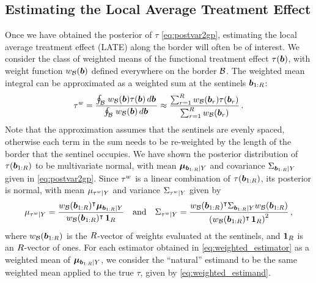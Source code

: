 \subsection{Estimating the Local Average Treatment Effect}
\label{sec:ate}

Once we have obtained the posterior of \(\tau\) \eqref{eq:postvar2gp}, estimating the local average treatment effect (LATE) along the border will often be of interest.
We consider the class of weighted means of the functional treatment effect \(\tau\del{\sentinel}\),
with weight function \(w_{\mathcal{B}}(\bm{b})\) defined everywhere on the border \(\mathcal{B}\).
The weighted mean integral can be approximated as a weighted sum at the sentinels \(\bm{b}_{1:R}\):
\begin{equation}
    \tau^{w} = \frac{\oint_{\mathcal{B}} \left. w_{\mathcal{B}}(\bm{b}) \tau(\bm{b}) \mathop{d \bm{b}} \right.}
    {\oint_{\mathcal{B}} \left. w_{\mathcal{B}}(\bm{b}) \mathop{d \bm{b}} \right.}
    \approx \frac{\sum_{r=1}^R w_{\mathcal{B}}(\bm{b}_r) \tau(\bm{b}_r)}
    {\sum_{r=1}^R w_{\mathcal{B}}(\bm{b}_r) } \,.
\label{eq:weighted_estimand}
\end{equation}
Note that the approximation assumes that the sentinels are evenly spaced, otherwise each term in the sum needs to be re-weighted by the length of the border that the sentinel occupies.
We have shown the posterior distribution of \(\tau(\bm{b}_{1:R})\) to be multivariate normal, with mean \(\bm{\mu}_{\bm{b}_{1:R} \mid Y}\) and covariance \(\Sigma_{\bm{b}_{1:R} \mid Y}\) given in \autoref{eq:postvar2gp}.
Since \(\tau^{w}\) is a linear combination of \(\tau(\bm{b}_{1:R})\), its posterior is normal, with mean \(\mu_{\tau^{w} \mid Y}\) and variance \(\Sigma_{\tau^{w} \mid Y}\) given by
\begin{equation}
    \mu_{\tau^{w} \mid Y} = \frac{w_{\mathcal{B}}(\bm{b}_{1:R})^{\intercal} \bm{\mu}_{\bm{b}_{1:R} \mid Y}}
    {w_{\mathcal{B}}(\bm{b}_{1:R})^{\intercal}  \operatorname{\mathbf{1}}_R}\quad\text{and}\quad
    \Sigma_{\tau^{w} \mid Y} = \frac{w_{\mathcal{B}}(\bm{b}_{1:R})^{\intercal} \Sigma_{\bm{b}_{1:R} \mid Y} w_{\mathcal{B}}(\bm{b}_{1:R})}
    { \left\lparen w_{\mathcal{B}}(\bm{b}_{1:R})^{\intercal}  \operatorname{\mathbf{1}}_R \right\rparen^2 } \,,
\label{eq:weighted_estimator}
\end{equation}
where \(w_{\mathcal{B}}(\bm{b}_{1:R})\) is the \(R\)-vector of weights evaluated at the sentinels, and \(\operatorname{\mathbf{1}}_R\) is an \(R\)-vector of ones.
For each estimator obtained in \autoref{eq:weighted_estimator} as a weighted mean of \(\bm{\mu}_{\bm{b}_{1:R} \mid Y}\), we consider the ``natural'' estimand to be the same weighted mean applied to the true \(\tau\), given by \autoref{eq:weighted_estimand}.

